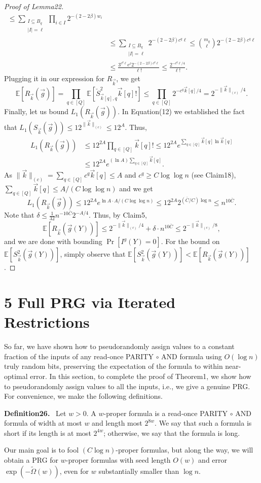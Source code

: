 \documentclass[10pt,a4paper]{article}
\newenvironment{authorclaim}[1]{\par\medskip\noindent\textbf{#1.}\ \ignorespaces}{\par\medskip}
\begin{document}
\begin{proof}[Proof of Lemma22]
\begin{align*}
\le\sum_{\substack{I\subseteq B_q\\|I|=\ell}}\prod_{i\in I}2^{-(2-2\beta)w_i}\\
&\le\sum_{\substack{I\subseteq B_q\\|I|=\ell}}2^{-(2-2\beta)c^q\ell}
\le\binom{m_q}{\ell}2^{-(2-2\beta)c^q\ell}\\
&\le\frac{3^{c^q\ell}e^\ell2^{-(2-2\beta)c^q\ell}}{\ell!}
\le\frac{2^{-c^q\ell/4}}{\ell!}.
\end{align*}
Plugging it in our expression for $R_{\vec k}$, we get
\begin{equation}
\mathbb E[R_{\vec k}(\vec g)]
=\prod_{q\in[Q]}\mathbb E[\check S_{\vec k[q],q}^2\vec k[q]!]
\le\prod_{q\in[Q]}2^{-c^q\vec k[q]/4}=2^{-\|\vec k\|_{(c)}/4}.\tag{13}
\end{equation}
Finally, let us bound $L_1(R_{\vec k}(\vec g))$. In Equation(12) we established the fact that $L_1(S_{\vec k}(\vec g))\le12^{\|\vec k\|_{(c)}}\le12^A$. Thus,
\begin{align*}
L_1(R_{\vec k}(\vec g))
&\le12^{2A}\prod_{q\in[Q]}\vec k[q]!
\le12^{2A}e^{\sum_{q\in[Q]}\vec k[q]\ln\vec k[q]}\\
&\le12^{2A}e^{(\ln A)\sum_{q\in[Q]}\vec k[q]}.
\end{align*}
As $\|\vec k\|_{(c)}=\sum_{q\in[Q]}c^q\vec k[q]\le A$ and $c^q\ge C\log\log n$ (see Claim18), $\sum_{q\in[Q]}\vec k[q]\le A/(C\log\log n)$ and we get
\[
L_1(R_{\vec k}(\vec g))
\le12^{2A}e^{\ln A\cdot A/(C\log\log n)}
\le12^{2A}2^{(\bar C/C)\log n}\le n^{10\bar C}.
\]
Note that $\delta\le\frac1{32}n^{-10\bar C}2^{-A/4}$. Thus, by Claim5,
\[
\mathbb E[R_{\vec k}(\vec g(Y))]
\le2^{-\|\vec k\|_{(c)}/4}+\delta\cdot n^{10\bar C}
\le2^{-\|\vec k\|_{(c)}/8},
\]
and we are done with bounding $\Pr[I^g(Y)=0]$. For the bound on $\mathbb E[S_{\vec k}^2(\vec g(Y))]$, simply observe that $\mathbb E[S_{\vec k}^2(\vec g(Y))]<\mathbb E[R_{\vec k}(\vec g(Y))]$.
\end{proof}

\section*{5 Full PRG via Iterated Restrictions}
So far, we have shown how to pseudorandomly assign values to a constant fraction of the inputs of any read-once PARITY $\circ$ AND formula using $O(\log n)$ truly random bits, preserving the expectation of the formula to within near-optimal error. In this section, to complete the proof of Theorem1, we show how to pseudorandomly assign values to all the inputs, i.e., we give a genuine PRG.
For convenience, we make the following definitions.
\begin{authorclaim}{Definition26}
Let $w>0$. A $w$-proper formula is a read-once PARITY $\circ$ AND formula of width at most $w$ and length most $2^{8w}$. We say that such a formula is short if its length is at most $2^{4w}$; otherwise, we say that the formula is long.
\end{authorclaim}
Our main goal is to fool $(C\log n)$-proper formulas, but along the way, we will obtain a PRG for $w$-proper formulas with seed length $O(w)$ and error $\exp(-\widetilde\Omega(w))$, even for $w$ substantially smaller than $\log n$.
\end{document}
